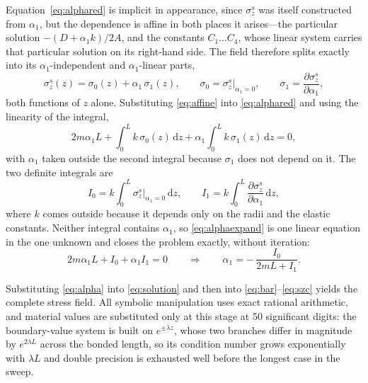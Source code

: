 Equation~\eqref{eq:alphared} is implicit in appearance, since $\sigma_z^{s}$
was itself constructed from $\alpha_1$, but the dependence is affine in both
places it arises---the particular solution $-(D + \alpha_1 k)/2A$, and the
constants $C_1 \dots C_4$, whose linear system carries that particular
solution on its right-hand side. The field therefore splits exactly into its
$\alpha_1$-independent and $\alpha_1$-linear parts,
\begin{equation}
\label{eq:affine}
\sigma_z^{s}(z) = \sigma_0(z) + \alpha_1\,\sigma_1(z),
\qquad
\sigma_0 = \left.\sigma_z^{s}\right|_{\alpha_1 = 0},
\qquad
\sigma_1 = \frac{\partial \sigma_z^{s}}{\partial \alpha_1},
\end{equation}
both functions of $z$ alone. Substituting \eqref{eq:affine} into
\eqref{eq:alphared} and using the linearity of the integral,
\begin{equation}
\label{eq:alphaexpand}
2m\alpha_1 L + \int_0^L k\,\sigma_0(z)\,\mathrm{d}z
  + \alpha_1 \int_0^L k\,\sigma_1(z)\,\mathrm{d}z = 0 ,
\end{equation}
with $\alpha_1$ taken outside the second integral because $\sigma_1$ does not
depend on it. The two definite integrals are
\begin{equation}
\label{eq:I0I1}
I_0 = k \int_0^L \left.\sigma_z^{s}\right|_{\alpha_1 = 0}\,\mathrm{d}z ,
\qquad
I_1 = k \int_0^L \frac{\partial \sigma_z^{s}}{\partial \alpha_1}\,\mathrm{d}z ,
\end{equation}
where $k$ comes outside because it depends only on the radii and the elastic
constants. Neither integral contains $\alpha_1$, so \eqref{eq:alphaexpand} is
one linear equation in the one unknown and closes the problem exactly,
without iteration:
\begin{equation}
\label{eq:alpha}
2m\alpha_1 L + I_0 + \alpha_1 I_1 = 0
\qquad\Longrightarrow\qquad
\alpha_1 = -\,\frac{I_0}{2mL + I_1} .
\end{equation}
 
Substituting \eqref{eq:alpha} into \eqref{eq:solution} and then into
\eqref{eq:bar}--\eqref{eq:szc} yields the complete stress field. All symbolic
manipulation uses exact rational arithmetic, and material values are
substituted only at this stage at 50 significant digits: the boundary-value
system is built on $e^{\pm\lambda z}$, whose two branches differ in magnitude
by $e^{2\lambda L}$ across the bonded length, so its condition number grows
exponentially with $\lambda L$ and double precision is exhausted well before
the longest case in the sweep.
\par
\endgroup

